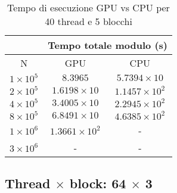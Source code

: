 \begin{table}[ht!]
    \begin{center}
        \renewcommand{\arraystretch}{1.5}
        \begin{adjustbox}{width=.45\textwidth}
            \begin{tabular}{ |c|c|c| }
                \hline
                \multicolumn{1}{|c}{} & \multicolumn{2}{|c|}{Tempo totale modulo (s)} \\
                \hline
                 N & GPU & CPU \\
                 \hline 
                 $1 \times 10^5$ & $8.3965$ & $5.7394 \times 10$ \\
                 \hline 
                 $2 \times 10^5$ & $1.6198 \times 10$ & $1.1457 \times 10^{2}$\\
                 \hline 
                 $4 \times 10^5$ & $3.4005 \times 10$ & $2.2945 \times 10^{2}$ \\
                 \hline 
                 $8 \times 10^5$ & $6.8491 \times 10$ & $4.6385 \times 10^{2}$ \\
                 \hline 
                 $1 \times 10^6$ & $1.3661 \times 10^{2}$ & - \\
                 \hline 
                 $3 \times 10^6$ & - & - \\
                 \hline 
            \end{tabular}
        \end{adjustbox}
    \end{center}
    \caption{Tempo di esecuzione GPU vs CPU per 40 thread e 5 blocchi}
    \label{tab:time_table_40x5}
\end{table}


\newpage
\subsection{Thread $\times$ block: 64 $\times$ 3}

